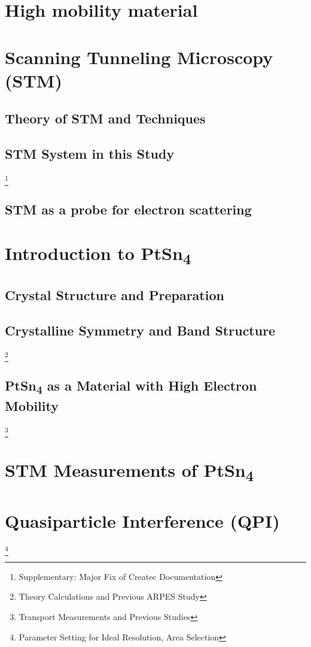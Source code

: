 \chapter{High mobility material}

\chapter{Scanning Tunneling Microscopy (STM)}
	\section{Theory of STM and Techniques}
	\section{STM System in this Study}
	\footnote{Supplementary: Major Fix of Createc Documentation}
	\section{STM as a probe for electron scattering}

\chapter{Introduction to PtSn\textsubscript{4}}
	\section{Crystal Structure and Preparation}
	\section{Crystalline Symmetry and Band Structure}
\footnote{Theory Calculations and Previous ARPES Study}
	\section{PtSn\textsubscript{4} as a Material with High Electron Mobility}
	\footnote{Transport Measurements and Previous Studies}

\chapter{STM Measurements of PtSn\textsubscript{4}}


\chapter{Quasiparticle Interference (QPI)}

	\footnote{Parameter Setting for Ideal Resolution, Area Selection}

